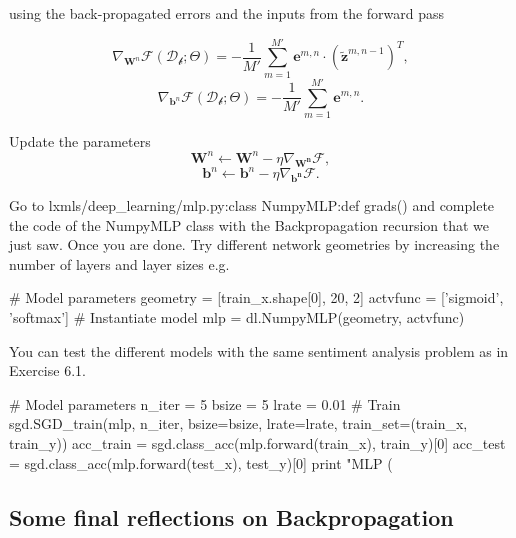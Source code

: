 \begin{algorithm}[th!]
\begin{algorithmic}[1]
		\ENDFOR	
        \ENDIF 

		\vspace{0.3cm}
         using the back-propagated errors and the inputs from the forward pass

        $$\nabla_{\mathbf{W}^n}\mathcal{F}(\mathcal{D_b};\Theta)  = -\frac{1}{M'} \sum_{m=1}^{M'} \mathbf{e}^{m,n} \cdot \left(\tilde{\mathbf{z}}^{m,n-1}\right)^T,$$ 
        $$\nabla_{\mathbf{b}^n}\mathcal{F}(\mathcal{D_b};\Theta)  = - \frac{1}{M'} \sum_{m=1}^{M'} \mathbf{e}^{m,n}.$$  

		\vspace{0.3cm}
        \STATE Update the parameters 
            $$\mathbf{W}^n \leftarrow \mathbf{W}^n - \eta \nabla_\mathbf{W^n}\mathcal{F},$$ 
            $$\mathbf{b}^n \leftarrow \mathbf{b}^n - \eta \nabla_\mathbf{b^n}\mathcal{F}.$$ 

	\ENDFOR

	\ENDFOR
	\ENDFOR
\end{algorithmic}
\end{algorithm}

\clearpage

\begin{exercise}
Go to lxmls/deep\_learning/mlp.py:class NumpyMLP:def grads() and complete the
code of the NumpyMLP class with the Backpropagation recursion that we just saw.
Once you are done. Try different network geometries by increasing the number of
layers and layer sizes e.g.
\begin{python}
# Model parameters
geometry = [train_x.shape[0], 20, 2]
actvfunc = ['sigmoid', 'softmax'] 
# Instantiate model
mlp      = dl.NumpyMLP(geometry, actvfunc) 
\end{python}
You can test the different models with the same sentiment analysis problem as
in Exercise 6.1. 
\begin{python}
# Model parameters
n_iter = 5
bsize  = 5
lrate  = 0.01
# Train
sgd.SGD_train(mlp, n_iter, bsize=bsize, lrate=lrate, train_set=(train_x, train_y))
acc_train = sgd.class_acc(mlp.forward(train_x), train_y)[0]
acc_test  = sgd.class_acc(mlp.forward(test_x), test_y)[0]
print "MLP (%
\end{python}
\end{exercise}

\subsection{Some final reflections on Backpropagation}

